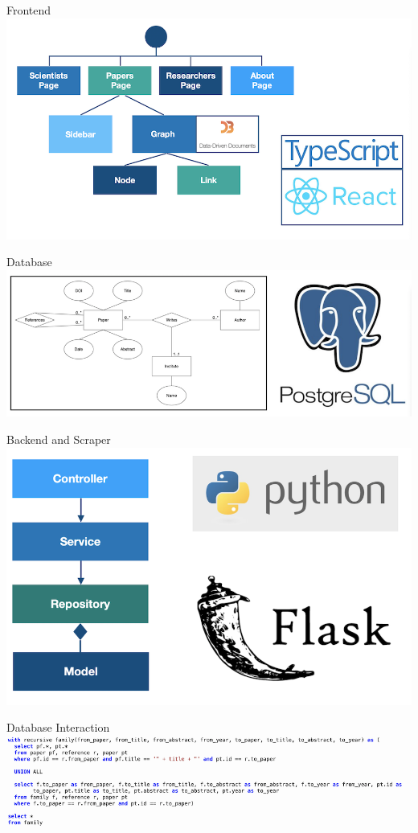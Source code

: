 \documentclass{beamer}
\begin{document}
\begin{frame}{Frontend}
    \includegraphics{img_06.png}
\end{frame}

\begin{frame}{Database}
    \includegraphics{img_07.png}
\end{frame}

\begin{frame}{Backend and Scraper}
    \includegraphics{img_08.png}
\end{frame}

\begin{frame}{Database Interaction}
    \includegraphics{img_09.png}
\end{frame}
\end{document}
